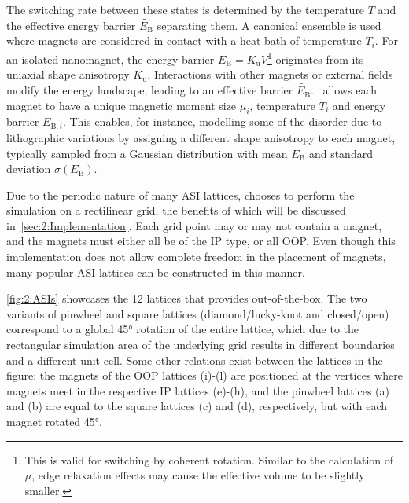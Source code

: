 The switching rate between these states is determined by the temperature $T$ and the effective energy barrier $\widetilde{E_\mathrm{B}}$ separating them.
A canonical ensemble is used where magnets are considered in contact with a heat bath of temperature $T_i$.
For an isolated nanomagnet, the energy barrier $E_\mathrm{B} = K_\mathrm{u} V$\footnote{
	This is valid for switching by coherent rotation. Similar to the calculation of $\mu$, edge relaxation effects may cause the effective volume to be slightly smaller.
} originates from its uniaxial shape anisotropy $K_\mathrm{u}$.
Interactions with other magnets or external fields modify the energy landscape, leading to an effective barrier $\widetilde{E_\mathrm{B}}$.~\cite{leo2021chiral}
\hotspice allows each magnet to have a unique magnetic moment size $\mu_i$, temperature $T_i$ and energy barrier $E_{\mathrm{B},i}$.
This enables, for instance, modelling some of the disorder due to lithographic variations by assigning a different shape anisotropy to each magnet, typically sampled from a Gaussian distribution with mean $E_\mathrm{B}$ and standard deviation $\sigma(E_\mathrm{B})$. \\\par

Due to the periodic nature of many ASI lattices, \hotspice chooses to perform the simulation on a rectilinear grid, the benefits of which will be discussed in~\cref{sec:2:Implementation}.
Each grid point may or may not contain a magnet, and the magnets must either all be of the IP type, or all OOP.
Even though this implementation does not allow complete freedom in the placement of magnets, many popular ASI lattices can be constructed in this manner. \par
\cref{fig:2:ASIs} showcases the 12 lattices that \hotspice provides out-of-the-box. The two variants of pinwheel and square lattices (diamond/lucky-knot and closed/open) correspond to a global \ang{45} rotation of the entire lattice, which due to the rectangular simulation area of the underlying grid results in different boundaries and a different unit cell.
Some other relations exist between the lattices in the figure: the magnets of the OOP lattices (i)-(l) are positioned at the vertices where magnets meet in the respective IP lattices (e)-(h), and the pinwheel lattices (a) and (b) are equal to the square lattices (c) and (d), respectively, but with each magnet rotated \ang{45}. \\\par



